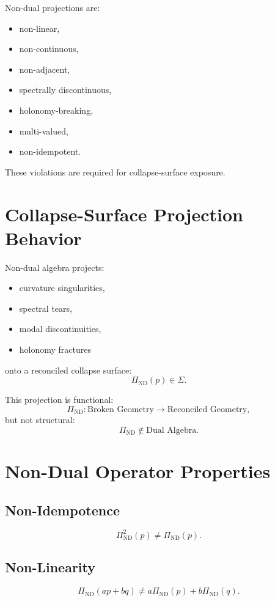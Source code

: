 \documentclass[11pt]{article}
\begin{document}
Non-dual projections are:
\begin{itemize}
  \item non-linear,
  \item non-continuous,
  \item non-adjacent,
  \item spectrally discontinuous,
  \item holonomy-breaking,
  \item multi-valued,
  \item non-idempotent.
\end{itemize}

These violations are required for collapse-surface exposure.

\section{Collapse-Surface Projection Behavior}

Non-dual algebra projects:
\begin{itemize}
  \item curvature singularities,
  \item spectral tears,
  \item modal discontinuities,
  \item holonomy fractures
\end{itemize}
onto a reconciled collapse surface:
\[
\Pi_{\mathrm{ND}}(p) \in \Sigma.
\]

This projection is functional:
\[
\Pi_{\mathrm{ND}} : \text{Broken Geometry} \to \text{Reconciled Geometry},
\]
but not structural:
\[
\Pi_{\mathrm{ND}} \notin \text{Dual Algebra}.
\]

\section{Non-Dual Operator Properties}

\subsection{Non-Idempotence}
\[
\Pi_{\mathrm{ND}}^2(p) \ne \Pi_{\mathrm{ND}}(p).
\]

\subsection{Non-Linearity}
\[
\Pi_{\mathrm{ND}}(a p + b q) \ne a \Pi_{\mathrm{ND}}(p) + b \Pi_{\mathrm{ND}}(q).
\]
\end{document}
